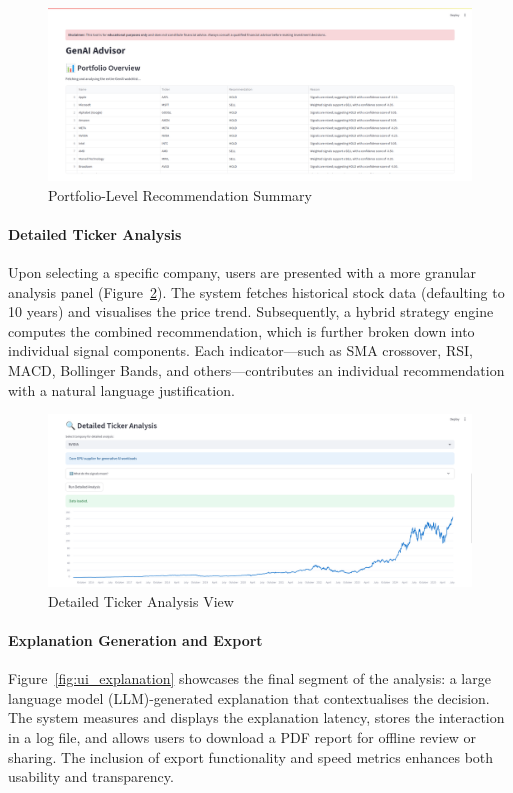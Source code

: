 \begin{figure}[h]
\centering
\includegraphics[width=0.9\linewidth]{assets/ui1-portfolio_overview.png}
\caption{Portfolio-Level Recommendation Summary}
\label{fig:ui_portfolio}
\end{figure}

\paragraph{Detailed Ticker Analysis}
Upon selecting a specific company, users are presented with a more granular analysis panel (Figure~\ref{fig:ui_detailed}). The system fetches historical stock data (defaulting to 10 years) and visualises the price trend. Subsequently, a hybrid strategy engine computes the combined recommendation, which is further broken down into individual signal components. Each indicator—such as SMA crossover, RSI, MACD, Bollinger Bands, and others—contributes an individual recommendation with a natural language justification.

\begin{figure}[h]
\centering
\includegraphics[width=0.9\linewidth]{assets/ui2-ticker_analysis.png}
\caption{Detailed Ticker Analysis View}
\label{fig:ui_detailed}
\end{figure}

\paragraph{Explanation Generation and Export}
Figure~\ref{fig:ui_explanation} showcases the final segment of the analysis: a large language model (LLM)-generated explanation that contextualises the decision. The system measures and displays the explanation latency, stores the interaction in a log file, and allows users to download a PDF report for offline review or sharing. The inclusion of export functionality and speed metrics enhances both usability and transparency.

